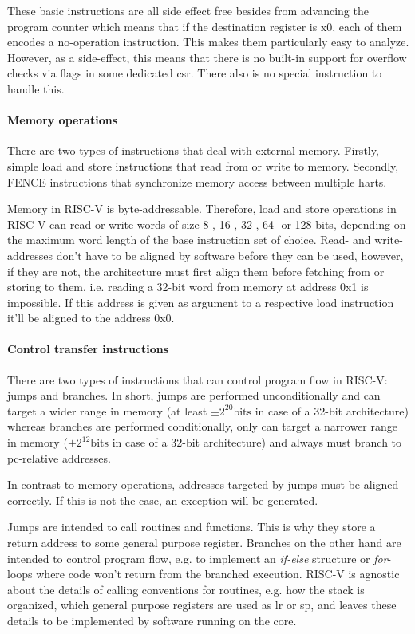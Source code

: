 These basic instructions are all side effect free besides from advancing the program counter which means that if the destination register is x0, each of them encodes a no-operation instruction.
This makes them particularly easy to analyze.
However, as a side-effect, this means that there is no built-in support for overflow checks via flags in some dedicated \gls{csr}.
There also is no special instruction to handle this.

\paragraph{Memory operations}
There are two types of instructions that deal with external memory.
Firstly, simple load and store instructions that read from or write to memory.
Secondly, FENCE instructions that synchronize memory access between multiple \glspl{hart}.

Memory in RISC-V is byte-addressable.
Therefore, load and store operations in RISC-V can read or write words of size 8-, 16-, 32-, 64- or 128-bits, depending on the maximum word length of the base instruction set of choice.
Read- and write-addresses don't have to be aligned by software before they can be used, however, if they are not, the architecture must first align them before fetching from or storing to them, i.e. reading a 32-bit word from memory at address 0x1 is impossible.
If this address is given as argument to a respective load instruction it'll be aligned to the address 0x0.

\paragraph{Control transfer instructions}
There are two types of instructions that can control program flow in RISC-V: jumps and branches.
In short, jumps are performed unconditionally and can target a wider range in memory (at least $ \pm 2^{20}\text{bits} $ in case of a 32-bit architecture) whereas branches are performed conditionally, only can target a narrower range in memory ($ \pm 2^{12}\text{bits} $ in case of a 32-bit architecture) and always must branch to \gls{pc}-relative addresses.

In contrast to memory operations, addresses targeted by jumps must be aligned correctly.
If this is not the case, an exception will be generated.

Jumps are intended to call routines and functions.
This is why they store a return address to some general purpose register.
Branches on the other hand are intended to control program flow, e.g. to implement an \textit{if-else} structure or \textit{for}-loops where code won't return from the branched execution.
RISC-V is agnostic about the details of calling conventions for routines, e.g. how the stack is organized, which general purpose registers are used as \gls{lr} or \gls{sp}, and leaves these details to be implemented by software running on the core.

